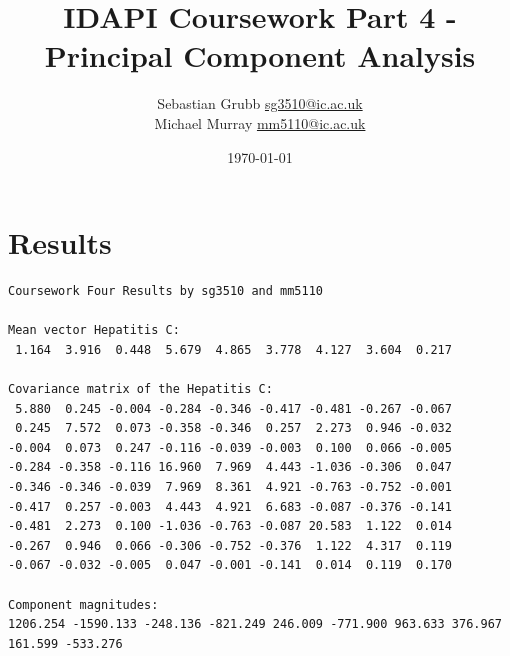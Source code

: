 \documentclass[10pt,a4paper]{article}
\title{IDAPI Coursework Part 4 - Principal Component Analysis}
\author{Sebastian Grubb \href{mailto:sg3510@ic.ac.uk}{sg3510@ic.ac.uk}\\Michael Murray \href{mailto:mm5110@ic.ac.uk}{mm5110@ic.ac.uk}}
\date{\today}
\begin{document}
\maketitle


\section{Results}
\begin{verbatim}
Coursework Four Results by sg3510 and mm5110

Mean vector Hepatitis C:
 1.164  3.916  0.448  5.679  4.865  3.778  4.127  3.604  0.217 

Covariance matrix of the Hepatitis C:
 5.880  0.245 -0.004 -0.284 -0.346 -0.417 -0.481 -0.267 -0.067 
 0.245  7.572  0.073 -0.358 -0.346  0.257  2.273  0.946 -0.032 
-0.004  0.073  0.247 -0.116 -0.039 -0.003  0.100  0.066 -0.005 
-0.284 -0.358 -0.116 16.960  7.969  4.443 -1.036 -0.306  0.047 
-0.346 -0.346 -0.039  7.969  8.361  4.921 -0.763 -0.752 -0.001 
-0.417  0.257 -0.003  4.443  4.921  6.683 -0.087 -0.376 -0.141 
-0.481  2.273  0.100 -1.036 -0.763 -0.087 20.583  1.122  0.014 
-0.267  0.946  0.066 -0.306 -0.752 -0.376  1.122  4.317  0.119 
-0.067 -0.032 -0.005  0.047 -0.001 -0.141  0.014  0.119  0.170 

Component magnitudes:
1206.254 -1590.133 -248.136 -821.249 246.009 -771.900 963.633 376.967 161.599 -533.276 
\end{verbatim}
\FloatBarrier
\newpage
\end{document}
